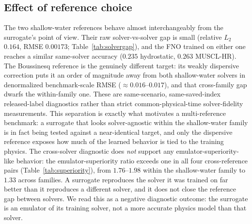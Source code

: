 \subsection{Effect of reference choice}
The two shallow-water references behave almost interchangeably from the surrogate's point of view. Their raw solver-vs-solver gap is small (relative $L_2$ $0.164$, RMSE $0.00173$; Table~\ref{tab:solvergap}), and the FNO trained on either one reaches a similar same-solver accuracy ($0.235$ hydrostatic, $0.263$ MUSCL-HR). The Boussinesq reference is the genuinely different target: its weakly dispersive correction puts it an order of magnitude away from both shallow-water solvers in denormalized benchmark-scale RMSE ($\approx 0.016$--$0.017$), and that cross-family gap dwarfs the within-family one. These are same-scenario, same-saved-index released-label diagnostics rather than strict common-physical-time solver-fidelity measurements. This separation is exactly what motivates a multi-reference benchmark: a surrogate that looks solver-agnostic within the shallow-water family is in fact being tested against a near-identical target, and only the dispersive reference exposes how much of the learned behavior is tied to the training physics. The cross-solver diagnostic does \emph{not} support any emulator-superiority-like behavior: the emulator-superiority ratio exceeds one in all four cross-reference pairs (Table~\ref{tab:superiority}), from $1.76$--$1.98$ within the shallow-water family to $1.33$ across families. A surrogate reproduces the solver it was trained on far better than it reproduces a different solver, and it does not close the reference gap between solvers. We read this as a negative diagnostic outcome: the surrogate is an emulator of its training solver, not a more accurate physics model than that solver.

